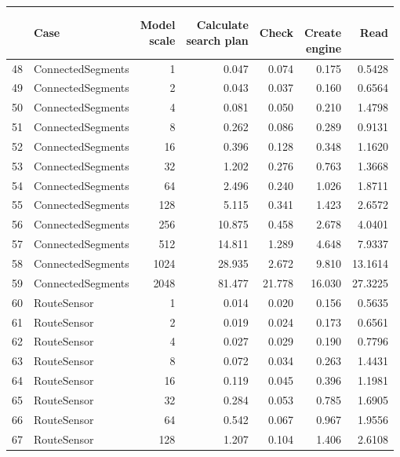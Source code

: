 \begin{table}[ht]
	\centering
	\begin{tabular}{rlrrrrr}
				\hline
		& Case & \shortstack{Model\\scale}  & \shortstack{Calculate\\search plan} & Check & \shortstack{\\Create\\engine} & Read\\ 
		\hline
		\hline
		48 & ConnectedSegments & 1 & 0.047 & 0.074 & 0.175 & 0.5428 \\ 
		49 & ConnectedSegments & 2 & 0.043 & 0.037 & 0.160 & 0.6564 \\ 
		50 & ConnectedSegments & 4 & 0.081 & 0.050 & 0.210 & 1.4798 \\ 
		51 & ConnectedSegments & 8 & 0.262 & 0.086 & 0.289 & 0.9131 \\ 
		52 & ConnectedSegments & 16 & 0.396 & 0.128 & 0.348 & 1.1620 \\ 
		53 & ConnectedSegments & 32 & 1.202 & 0.276 & 0.763 & 1.3668 \\ 
		54 & ConnectedSegments & 64 & 2.496 & 0.240 & 1.026 & 1.8711 \\ 
		55 & ConnectedSegments & 128 & 5.115 & 0.341 & 1.423 & 2.6572 \\ 
		56 & ConnectedSegments & 256 & 10.875 & 0.458 & 2.678 & 4.0401 \\ 
		57 & ConnectedSegments & 512 & 14.811 & 1.289 & 4.648 & 7.9337 \\ 
		58 & ConnectedSegments & 1024 & 28.935 & 2.672 & 9.810 & 13.1614 \\ 
		59 & ConnectedSegments & 2048 & 81.477 & 21.778 & 16.030 & 27.3225 \\ 
		\hline
		60 & RouteSensor & 1 & 0.014 & 0.020 & 0.156 & 0.5635 \\ 
		61 & RouteSensor & 2 & 0.019 & 0.024 & 0.173 & 0.6561 \\ 
		62 & RouteSensor & 4 & 0.027 & 0.029 & 0.190 & 0.7796 \\ 
		63 & RouteSensor & 8 & 0.072 & 0.034 & 0.263 & 1.4431 \\ 
		64 & RouteSensor & 16 & 0.119 & 0.045 & 0.396 & 1.1981 \\ 
		65 & RouteSensor & 32 & 0.284 & 0.053 & 0.785 & 1.6905 \\ 
		66 & RouteSensor & 64 & 0.542 & 0.067 & 0.967 & 1.9556 \\ 
		67 & RouteSensor & 128 & 1.207 & 0.104 & 1.406 & 2.6108 \\ 

\end{tabular}
\end{table}
